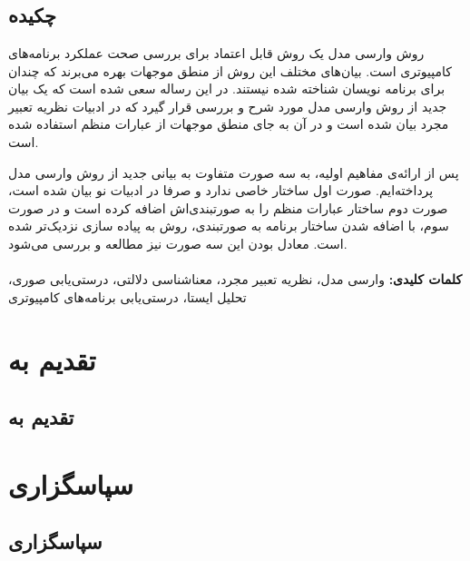 \documentclass[12pt]{report}
\begin{document}
\newpage
\pagestyle{plain}
\setcounter{page}{1}
\chapter*{}
\section*{چکیده}
روش وارسی مدل یک روش قابل اعتماد برای بررسی صحت عملکرد برنامه‌های کامپیوتری است. بیان‌های مختلف این روش از منطق موجهات بهره می‌برند که چندان برای برنامه نویسان شناخته شده نیستند. در این رساله سعی شده است که یک بیان جدید از روش وارسی مدل مورد شرح و بررسی قرار گیرد که در  ادبیات نظریه تعبیر مجرد بیان شده است و در آن به جای منطق موجهات از عبارات منظم استفاده شده است.

پس از ارائه‌ی مفاهیم اولیه‌، به سه صورت متفاوت به بیانی جدید از روش وارسی مدل پرداخته‌ایم. صورت اول ساختار خاصی ندارد و صرفا در ادبیات نو بیان شده است، صورت دوم ساختار عبارات منظم را به صورتبندی‌اش اضافه کرده است و در صورت سوم، با اضافه شدن ساختار برنامه‌ به صورتبندی، روش به پیاده سازی نزدیک‌تر شده است.
معادل بودن این سه صورت نیز مطالعه و بررسی می‌شود.\\\\


\textbf{کلمات کلیدی:}
وارسی مدل، نظریه تعبیر مجرد، معناشناسی دلالتی، درستی‌یابی صوری، تحلیل ایستا، درستی‌یابی برنامه‌های کامپیوتری
\chapter*{تقدیم به}
\section*{تقدیم به}

\chapter*{سپاسگزاری}
\section*{سپاسگزاری}
\end{document}
